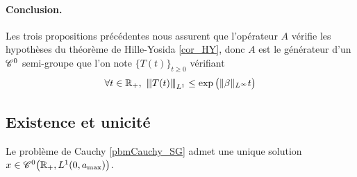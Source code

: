 \paragraph{Conclusion.} Les trois propositions précédentes nous assurent que l'opérateur $A$ vérifie les hypothèses du théorème de Hille-Yosida \ref{cor_HY}, donc $A$ est le générateur d'un $\mathscr{C}^0$ semi-groupe que l'on note $\big\{T(t)\big\}_{t \geq 0}$ vérifiant 
\begin{equation*}
    \forall t \in \bbR_+, \ \vertiii{T(t)}_{L^1} \leq \exp\big({\|\beta\|_{L^\infty}t}\big)
\end{equation*}

\subsection{Existence et unicité}
\begin{theorem}
    Le problème de Cauchy \eqref{pbmCauchy_SG} admet une unique solution $x \in \mathscr{C}^0\big(\mathbb{R}_+, L^1(0,a_{\max})\big)$.
\end{theorem}

